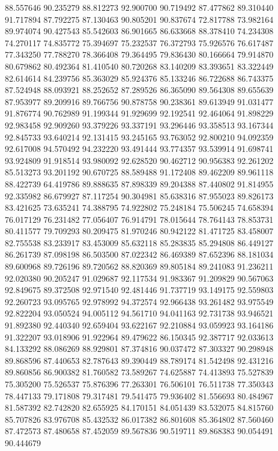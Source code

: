 88.557646
90.235279
88.812273
92.900700
90.719492
87.477862
89.310440
91.717894
87.792275
87.130463
90.805201
90.837674
72.817788
73.982164
89.974074
90.427543
85.542603
86.901665
86.633668
88.378410
74.234308
74.270117
74.835772
75.394697
75.232537
76.372793
75.926576
76.617487
77.343250
77.788270
78.366408
79.364495
79.836430
80.166664
79.914870
80.679862
80.492364
81.410540
80.720268
83.140209
83.393651
83.322449
82.614614
84.239756
85.363029
85.924376
85.133246
86.722688
86.743375
87.524948
88.093921
88.252652
87.289526
86.365090
89.564308
89.655639
87.953977
89.209916
89.766756
90.878758
90.238361
89.613949
91.031477
91.876774
90.762989
91.199344
91.929699
92.192541
92.464064
91.898229
92.983458
92.909260
93.379226
93.337191
93.296446
93.358513
93.167344
92.845733
93.640214
92.131415
93.245165
93.763052
92.800210
94.092359
92.617008
94.570492
94.232220
93.491444
93.774357
93.539914
91.698741
93.924809
91.918514
93.980092
92.628520
90.462712
90.956383
92.261202
85.513273
93.201192
90.670725
88.589488
91.172408
89.462209
89.961118
88.422739
64.419786
89.888635
87.898339
89.204388
87.440802
91.814955
92.335982
86.679927
87.117254
90.304981
85.638316
87.955023
89.826173
83.421625
73.635241
74.388795
74.922802
75.248184
75.506245
74.658394
76.017129
76.231482
77.056407
76.914791
78.015644
78.764143
78.853731
80.411577
79.709293
80.209475
81.970246
80.942122
81.471725
83.458007
82.755538
83.233917
83.453009
85.632118
85.283835
85.294808
86.449127
86.261739
87.098198
86.503500
87.022342
86.469389
87.652396
88.181034
89.600968
89.726196
89.720562
88.820369
89.805184
89.241083
91.236211
92.020380
90.205247
91.029687
92.117534
91.983367
91.209829
90.567063
92.849675
89.372508
92.971540
92.481446
91.737719
93.149175
92.559803
92.260723
93.095765
92.978992
94.372574
92.966438
93.261482
93.975549
92.822204
93.050524
94.005112
94.561710
94.041163
92.731738
93.946521
91.892380
92.440340
92.659404
93.622167
92.210884
93.059923
93.164186
91.322207
93.018906
91.922964
89.479622
86.150345
92.387717
92.033613
84.133292
88.086269
88.929801
87.374816
90.037472
87.303327
90.298948
89.868596
87.440653
82.787643
89.390449
88.789174
81.542498
92.431216
89.860856
86.900382
81.760582
73.589267
74.625887
74.413893
75.527839
75.305200
75.526537
75.876396
77.263301
76.506101
76.511738
77.350343
78.447133
79.171808
79.317481
79.541475
79.936402
81.556693
80.484967
81.587392
82.742820
82.655925
84.170151
84.051439
83.532075
84.815760
85.707826
83.976708
85.432532
86.017382
86.801608
85.364802
87.560460
87.472573
87.480658
87.452059
89.567836
90.519711
89.868383
90.054491
90.444679
